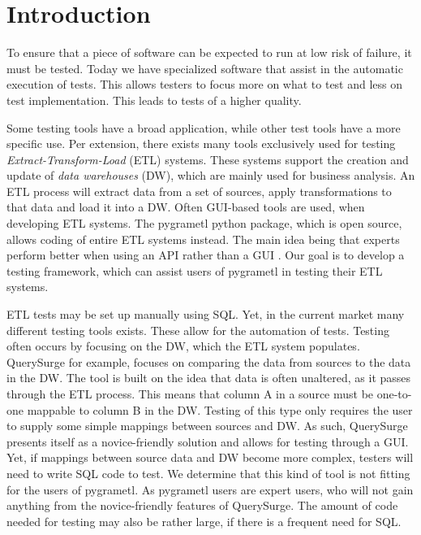 \section{Introduction}\label{intro} %
To ensure that a piece of software can be expected to run at low risk of failure, it must be tested. Today we have specialized software that assist in the automatic execution of tests. This allows testers to focus more on what to test and less on test implementation. This leads to tests of a higher quality.

Some testing tools have a broad application, while other test tools have a more specific use. Per extension, there exists many tools exclusively used for testing \textit{Extract-Transform-Load} (ETL) systems. These systems support the creation and update of \textit{data warehouses} (DW), which are mainly used for business analysis. An ETL process will extract data from a set of sources, apply transformations to that data and load it into a DW. Often GUI-based tools are used, when developing ETL systems. The pygrametl python package, which is open source, allows coding of entire ETL systems instead. The main idea being that experts perform better when using an API rather than a GUI \cite{thomsen2009pygrametl}. Our goal is to develop a testing framework, which can assist users of pygrametl in testing their ETL systems.

ETL tests may be set up manually using SQL. Yet, in the current market many different testing tools exists. These allow for the automation of tests. Testing often occurs by focusing on the DW, which the ETL system populates. QuerySurge\cite{QuerySurge} for example, focuses on comparing the data from sources to the data in the DW. The tool is built on the idea that data is often unaltered, as it passes through the ETL process. This means that column A in a source must be one-to-one mappable to column B in the DW. Testing of this type only requires the user to supply some simple mappings between sources and DW. As such, QuerySurge presents itself as a novice-friendly solution and allows for testing through a GUI. Yet, if mappings between source data and DW become more complex, testers will need to write SQL code to test. We determine that this kind of tool is not fitting for the users of pygrametl. As pygrametl users are expert users, who will not gain anything from the novice-friendly features of QuerySurge. The amount of code needed for testing may also be rather large, if there is a frequent need for SQL.


